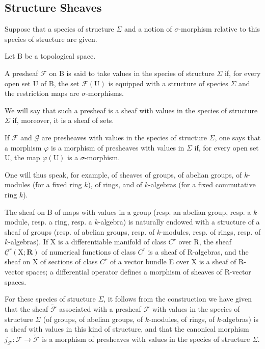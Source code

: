 \subsection{Structure Sheaves}

Suppose that a species of structure \(\Sigma\) and a notion of \(\sigma\)-morphism relative to this species of structure are given.

Let B be a topological space.

A presheaf \(\mathcal{F}\) on B is said to take values in the species of structure \(\Sigma\) if, for every open set U of B, the set \(\mathcal{F}(\mathrm{U})\) is equipped with a structure of species \(\Sigma\) and the restriction maps are \(\sigma\)-morphisms.

We will say that such a presheaf is a sheaf with values in the species of structure \(\Sigma\) if, moreover, it is a sheaf of sets.

If \(\mathcal{F}\) and \(\mathcal{G}\) are presheaves with values in the species of structure \(\Sigma\), one says that a morphism \(\varphi\) is a morphism of presheaves with values in \(\Sigma\) if, for every open set U, the map \(\varphi(\mathrm{U})\) is a \(\sigma\)-morphism.

One will thus speak, for example, of sheaves of groups, of abelian groups, of \(k\)-modules (for a fixed ring \(k\)), of rings, and of \(k\)-algebras (for a fixed commutative ring \(k\)).

The sheaf on B of maps with values in a group (resp. an abelian group, resp. a \(k\)-module, resp. a ring, resp. a \(k\)-algebra) is naturally endowed with a structure of a sheaf of groups (resp. of abelian groups, resp. of \(k\)-modules, resp. of rings, resp. of \(k\)-algebras). If X is a differentiable manifold of class \(C^{r}\) over R, the sheaf \(\underline{\mathcal{C}}^{r}(\mathrm{X};\mathbf{R})\) of numerical functions of class \(C^{r}\) is a sheaf of R-algebras, and the sheaf on X of sections of class \(C^{r}\) of a vector bundle E over X is a sheaf of R-vector spaces; a differential operator defines a morphism of sheaves of R-vector spaces.

For these species of structure \(\Sigma\), it follows from the construction we have given that the sheaf \(\widetilde{\mathcal{F}}\) associated with a presheaf \(\mathcal{F}\) with values in the species of structure \(\Sigma\) (of groups, of abelian groups, of \(k\)-modules, of rings, of \(k\)-algebras) is a sheaf with values in this kind of structure, and that the canonical morphism \(j_{\mathcal{F}}: \mathcal{F} \to \widetilde{\mathcal{F}}\) is a morphism of presheaves with values in the species of structure \(\Sigma\).

